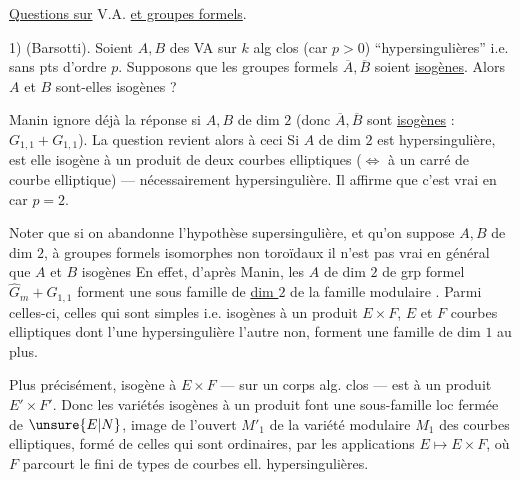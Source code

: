 

\uline{Questions sur} V.A. \uline{et groupes formels}.

1) (Barsotti). Soient $A,B$ des VA sur $k$ alg clos (car $p>0$) ``hypersingulières'' i.e. sans pts d'ordre $p$. Supposons que les groupes formels $\overline A,\overline B$ soient \uline{isogènes}. Alors $A$ et $B$ sont-elles isogènes ?


Manin ignore déjà la réponse si $A,B$ de dim $2$ (donc $\overline A,\overline B$ sont \uline{isogènes} : $G_{1,1}+G_{1,1}$). La question revient alors à ceci Si $A$ de dim $2$ est hypersingulière, est elle isogène à un produit de deux courbes elliptiques ($\Leftrightarrow$ à un carré de courbe elliptique) --- nécessairement hypersingulière. Il affirme que c'est vrai en car $p=2$.

Noter que si on abandonne l'hypothèse supersingulière, et qu'on suppose $A,B$  de dim $2$, à groupes formels isomorphes non toroïdaux il n'est pas vrai en général que $A$ et $B$ isogènes  En effet, d'après Manin, les  $A$ de dim $2$  de grp formel $\widehat G_m+G_{1,1}$ forment une sous famille   de \uline{dim $2$} de la famille modulaire . Parmi celles-ci, celles qui sont   simples i.e.  isogènes à un produit $E\times F$, $E$ et $F$ courbes elliptiques dont l'une  hypersingulière l'autre non, forment une famille de dim $1$ au plus. \margin{[ \uline{NB.} il n'y a pas de famille \unsure{continue}}



\margin{de variétés isogènes à $E\times F$ ! ]}

Plus précisément,  isogène à $E\times F$  --- sur un corps alg. clos --- est   à un produit $E'\times F'$. Donc les variétés isogènes à un produit font une sous-famille loc fermée de $\unsure{E|N}$, image de l'ouvert $M'_1$ de la variété modulaire $M_1$ des courbes elliptiques, formé de celles qui sont ordinaires, par les applications $E\mapsto E\times F$, où $F$ parcourt le  fini de types de courbes ell. hypersingulières. 

